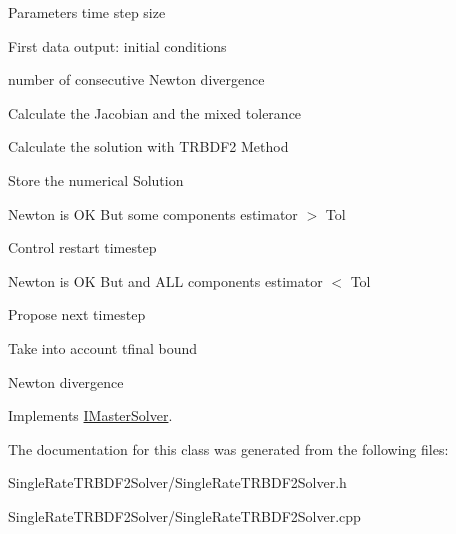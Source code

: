 Parameters time step size

First data output: initial conditions

number of consecutive Newton divergence

Calculate the Jacobian and the mixed tolerance

Calculate the solution with TRBDF2 Method

Store the numerical Solution

Newton is OK But some components estimator $>$ Tol

Control restart timestep

Newton is OK But and ALL components estimator $<$ Tol

Propose next timestep

Take into account tfinal bound

Newton divergence 

Implements \hyperlink{classIMasterSolver}{IMasterSolver}.

The documentation for this class was generated from the following files:\begin{DoxyCompactItemize}
\item 
SingleRateTRBDF2Solver/SingleRateTRBDF2Solver.h\item 
SingleRateTRBDF2Solver/SingleRateTRBDF2Solver.cpp\end{DoxyCompactItemize}
